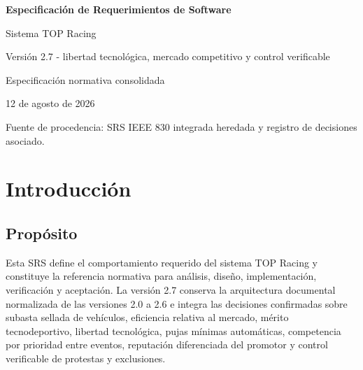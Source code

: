 \documentclass[10pt,letterpaper]{article}
\begin{document}
\begin{titlepage}
\centering
\vspace*{2.2cm}
{\Huge\bfseries Especificación de Requerimientos de Software\par}
\vspace{0.5cm}
{\LARGE Sistema TOP Racing\par}
\vspace{1.1cm}
{\Large Versión 2.7 - libertad tecnológica, mercado competitivo y control verificable\par}
\vspace{0.4cm}
{\large Especificación normativa consolidada\par}
\vfill
{\large 12 de agosto de 2026\par}
\vspace{0.4cm}
{\small Fuente de procedencia: SRS IEEE 830 integrada heredada y registro de decisiones asociado.\par}
\end{titlepage}
\tableofcontents
\clearpage
{}

\section{Introducción}
\subsection{Propósito}
Esta SRS define el comportamiento requerido del sistema TOP Racing y constituye la referencia normativa para análisis, diseño, implementación, verificación y aceptación. La versión 2.7 conserva la arquitectura documental normalizada de las versiones 2.0 a 2.6 e integra las decisiones confirmadas sobre subasta sellada de vehículos, eficiencia relativa al mercado, mérito tecnodeportivo, libertad tecnológica, pujas mínimas automáticas, competencia por prioridad entre eventos, reputación diferenciada del promotor y control verificable de protestas y exclusiones.
\end{document}
